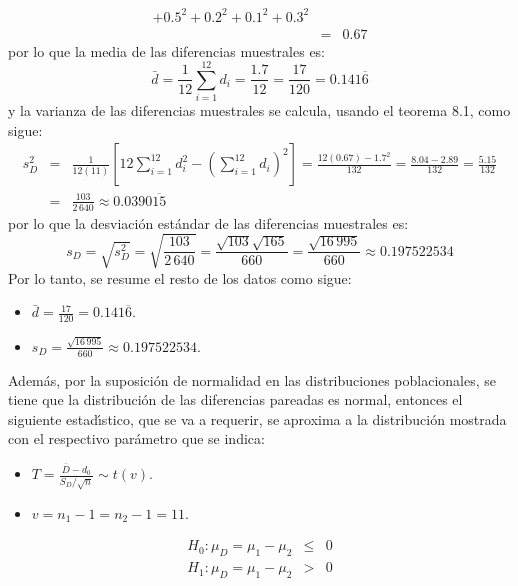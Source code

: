 \begin{solucion}
\begin{datos}
\begin{eqnarray*}
   + 0.5^2 + 0.2^2 + 0.1^2 + 0.3^2 \\
   & = & 0.67
  \end{eqnarray*}
  por lo que la media de las diferencias muestrales es:
  \begin{equation*}
   \bar{d} = \frac{1}{12} \sum_{i=1}^{12} d_i = \frac{1.7}{12}
   = \frac{17}{120} = 0.141\overline{6}
  \end{equation*}
  y la varianza de las diferencias muestrales se calcula,
  usando el teorema 8.1, como sigue:
  \begin{eqnarray*}
   s_D^2 & = &
   \frac{1}{12(11)} \left[
   12 \sum_{i=1}^{12} d_i^2 - \left( \sum_{i=1}^{12} d_i \right)^2
   \right]
   = \frac{12(0.67) - 1.7^2}{132} = \frac{8.04 - 2.89}{132} 
   = \frac{5.15}{132} \\
   & = & \frac{103}{2\,640} \approx 0.0390\overline{15}
  \end{eqnarray*}
  por lo que la desviaci\'on est\'andar de las diferencias
  muestrales es:
  \begin{equation*}
   s_D = \sqrt{s_D^2} = \sqrt{\frac{103}{2\,640}}
   = \frac{\sqrt{103}\sqrt{165}}{660}
   = \frac{\sqrt{16\,995}}{660}
   \approx 0.197522534
  \end{equation*}
  Por lo tanto, se resume el resto de los datos como sigue:
  \begin{itemize}
   \item $\bar{d} = \frac{17}{120} = 0.141\overline{6}$.
   \item $s_D = \frac{\sqrt{16\,995}}{660} \approx 0.197522534$.
  \end{itemize}
  Adem\'as, por la suposici\'on de normalidad
  en las distribuciones poblacionales,
  se tiene que la distribuci\'on de las diferencias pareadas
  es normal,
  entonces el siguiente estad\'{\i}stico, que se va a requerir,
  se aproxima a la distribuci\'on mostrada
  con el respectivo par\'ametro que se indica:
  \begin{itemize}
   \item $T = \frac{\overline{D} - d_0}{S_D/\sqrt{n}} \sim t(v)$.
   \item $v = n_1 - 1 = n_2 - 1 = 11$.
  \end{itemize}
 \end{datos}

 \begin{hipotesis}
  \begin{eqnarray*}
   H_0: \mu_D = \mu_1 - \mu_2 & \leq & 0 \\
   H_1: \mu_D = \mu_1 - \mu_2 &   >  & 0
  \end{eqnarray*}
 \end{hipotesis}


\end{solucion}
